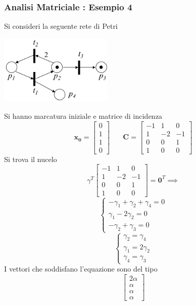 \documentclass[10pt, letterpaper]{report}
\begin{document}
\subsubsection{Analisi Matriciale : Esempio 4} 
Si consideri la seguente rete di Petri
\begin{center}
    \includegraphics[width=0.4\textwidth]{images/petriMatrix4.pdf}
\end{center}
Si hanno marcatura iniziale e matrice di incidenza 
$$\mathbf{x_0}=\begin{bmatrix}
    0\\ 1\\ 1\\ 0 
\end{bmatrix} \ \ \ \  \ \ \ \ 
\mathbf{C}=\begin{bmatrix}
    -1 & 1 & 0 \\
    1 & -2 & -1  \\ 
    0 & 0 & 1  \\ 
    1 & 0 & 0  
\end{bmatrix}
$$
Si trova il nucelo 
$$ \gamma^T\begin{bmatrix}
    -1 & 1 & 0 \\
    1 & -2 & -1  \\ 
    0 & 0 & 1  \\ 
    1 & 0 & 0  
\end{bmatrix}=\mathbf 0^T \implies$$
$$\begin{cases}
    -\gamma_1+\gamma_2+\gamma_4=0\\ 
    \gamma_1-2\gamma_2=0\\ 
    -\gamma_2+\gamma_3=0
\end{cases} $$
$$\begin{cases}
    \gamma_2=\gamma_4\\ 
    \gamma_1=2\gamma_2\\ 
    \gamma_4=\gamma_3
\end{cases} $$
I vettori che soddisfano l'equazione sono del tipo $$
\begin{bmatrix}
    2\alpha \\ 
    \alpha \\ 
    \alpha \\ 
    \alpha
\end{bmatrix}$$
\end{document}
